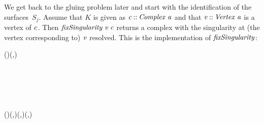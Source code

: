 We get back to the gluing problem later and start with the identification
of the surfaces~$S_j$. Assume that $K$ is given as \ensuremath{\Varid{c}\mathbin{::}\Conid{Complex}\;\Varid{a}} and
that \ensuremath{\Varid{v}\mathbin{::}\Conid{Vertex}\;\Varid{a}} is a vertex of \ensuremath{\Varid{c}}. Then \ensuremath{\Varid{fixSingularity}\;\Varid{v}\;\Varid{c}} returns
a complex with the singularity at (the vertex corresponding to) \ensuremath{\Varid{v}} resolved.
This is the implementation of \ensuremath{\Varid{fixSingularity}}:
\begin{hscode}\SaveRestoreHook
{}%
%
%
%
%
%
%
%
%
%
%
%
%
%
%
%
%
\>[B]{}\mathbin{::}(\;)\Rightarrow {}\;\to {}\;\to {}\;(,){}\<[E]%
\\
\>[B]{}\;\;\mathrel{=}{}\<[E]%
\\
\>[B]{}\<[5]%
\>[5]{}\;{}\<[10]%
\>[10]{}\<[14]%
\>[14]{}\mathrel{=}{}\<[14E]%
\>[17]{}\mathbin{\&\&\&}\;\<[E]%
\\
\>[10]{}\<[14]%
\>[14]{}\mathrel{=}{}\<[14E]%
\>[17]{}\;\;\<[E]%
\\
\>[10]{}\<[14]%
\>[14]{}\mathrel{=}{}\<[14E]%
\>[17]{}\;\;\<[E]%
\\
\>[B]{}\<[5]%
\>[5]{}\;{}\<[9]%
\>[9]{}\;\;\<[E]%
\\[\blanklineskip]%
\>[B]{}\mathbin{::}(\;)\Rightarrow {}\;(,)\to {}\;(,)\to {}\;(,){}\<[E]%
\\
\>[B]{}\;\;\mathrel{=}{}\<[E]%

\end{hscode}
